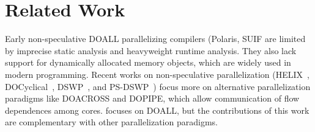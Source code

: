 \section{Related Work}






Early non-speculative DOALL parallelizing compilers
(Polaris\cite{blume:94:polaris},
SUIF\cite{amarasinghe:93:pldi,suif:94:stanford} are limited by imprecise
static analysis and heavyweight runtime analysis. They also lack
support for dynamically allocated memory objects, which are widely used in
modern programming. Recent works on non-speculative parallelization
(HELIX~\cite{simone:12:cgo}, DOCyclical~\cite{yu2016cyclical},
DSWP~\cite{ottoni:05:micro}, and PS-DSWP~\cite{raman:08a:cgo}) focus more
on alternative parallelization paradigms like DOACROSS and DOPIPE, which
allow communication of flow dependences among cores. \name focuses on DOALL,
but the contributions of this work are complementary with other
parallelization paradigms.

